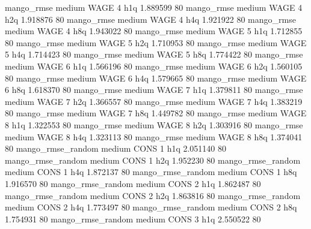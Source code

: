        mango_rmse     medium     WAGE                 4                  h1q  1.889599 80
       mango_rmse     medium     WAGE                 4                  h2q  1.918876 80
       mango_rmse     medium     WAGE                 4                  h4q  1.921922 80
       mango_rmse     medium     WAGE                 4                  h8q  1.943022 80
       mango_rmse     medium     WAGE                 5                  h1q  1.712855 80
       mango_rmse     medium     WAGE                 5                  h2q  1.710953 80
       mango_rmse     medium     WAGE                 5                  h4q  1.714423 80
       mango_rmse     medium     WAGE                 5                  h8q  1.774422 80
       mango_rmse     medium     WAGE                 6                  h1q  1.566196 80
       mango_rmse     medium     WAGE                 6                  h2q  1.560105 80
       mango_rmse     medium     WAGE                 6                  h4q  1.579665 80
       mango_rmse     medium     WAGE                 6                  h8q  1.618370 80
       mango_rmse     medium     WAGE                 7                  h1q  1.379811 80
       mango_rmse     medium     WAGE                 7                  h2q  1.366557 80
       mango_rmse     medium     WAGE                 7                  h4q  1.383219 80
       mango_rmse     medium     WAGE                 7                  h8q  1.449782 80
       mango_rmse     medium     WAGE                 8                  h1q  1.322553 80
       mango_rmse     medium     WAGE                 8                  h2q  1.303916 80
       mango_rmse     medium     WAGE                 8                  h4q  1.323113 80
       mango_rmse     medium     WAGE                 8                  h8q  1.374041 80
mango_rmse_random     medium     CONS                 1                  h1q  2.051140 80
mango_rmse_random     medium     CONS                 1                  h2q  1.952230 80
mango_rmse_random     medium     CONS                 1                  h4q  1.872137 80
mango_rmse_random     medium     CONS                 1                  h8q  1.916570 80
mango_rmse_random     medium     CONS                 2                  h1q  1.862487 80
mango_rmse_random     medium     CONS                 2                  h2q  1.863816 80
mango_rmse_random     medium     CONS                 2                  h4q  1.773497 80
mango_rmse_random     medium     CONS                 2                  h8q  1.754931 80
mango_rmse_random     medium     CONS                 3                  h1q  2.550522 80
